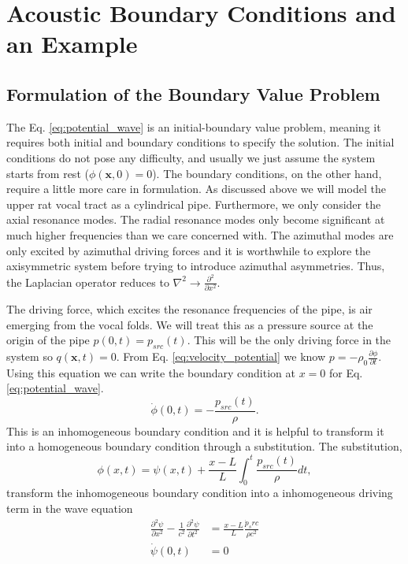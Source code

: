\documentclass[12pt, letter]{report}
\begin{document}
\section{Acoustic Boundary Conditions and an Example}
\subsection{Formulation of the Boundary Value Problem}
The Eq. \ref{eq:potential_wave} is an initial-boundary value problem, meaning it requires both initial and boundary conditions to specify the solution. The initial conditions do not pose any difficulty, and usually we just assume the system starts from rest ($\phi(\textbf{x},0)=0$). The boundary conditions, on the other hand, require a little more care in formulation. As discussed above we will model the upper rat vocal tract as a cylindrical pipe. Furthermore, we only consider the axial resonance modes. The radial resonance modes only become significant at much higher frequencies than we care concerned with. The azimuthal modes are only excited by azimuthal driving forces and it is worthwhile to explore the axisymmetric system before trying to introduce azimuthal asymmetries. Thus, the Laplacian operator reduces to $\nabla^2 \rightarrow \frac{\partial^2 }{\partial x^2}$. 

The driving force, which excites the resonance frequencies of the pipe, is air emerging from the vocal folds. We will treat this as a pressure source at the origin of the pipe $p(0,t)=p_{src}(t)$. This will be the only driving force in the system so $q(\textbf{x}, t)=0$. From Eq. \ref{eq:velocity_potential} we know $p= -\rho_0 \frac{\partial \phi}{\partial t}$. Using this equation we can write the boundary condition at $x=0$ for Eq. \ref{eq:potential_wave}.
\begin{equation}
\dot{\phi}(0,t) = - \frac{p_{src}(t)}{\rho}.
\end{equation}
This is an inhomogeneous boundary condition and it is helpful to transform it into a homogeneous boundary condition through a substitution. The substitution,
\begin{equation}   
\phi(x,t) = \psi(x,t) + \frac{x-L}{L}\int_0^t \frac{p_{src}(t)}{\rho}dt,
\end{equation}
transform the inhomogeneous boundary condition into a inhomogeneous driving term in the wave equation
\begin{equation}
\label{eq:one_boundary}
\begin{split}
\frac{\partial^2 \psi}{\partial x^2} - \frac{1}{c^2}\frac{\partial^2 \psi}{\partial t^2} &= \frac{x-L}{L}\frac{\dot{p}_src}{\rho c^2} \\
\dot{\psi}(0,t) &= 0
\end{split}
\end{equation}
\end{document}

